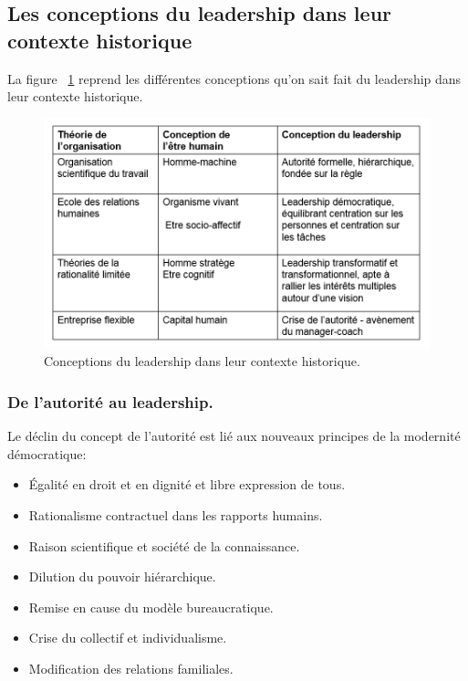 \documentclass[12pt]{article}
\begin{document}
	\subsection{Les conceptions du leadership dans leur contexte historique}
	
	La figure ~\ref{conceptions_leaderships} reprend les différentes conceptions qu'on sait fait du leadership dans leur contexte historique.

	\begin{figure}[h]
		\begin{center}
		\includegraphics[scale=0.6]{conceptions_leaderships.png}
		\caption{Conceptions du leadership dans leur contexte historique.}
		\label{conceptions_leaderships}
		\end{center}
	\end{figure}
	
	
	\subsubsection{De l'autorité au leadership.}
	
	Le déclin du concept de l'autorité est lié aux nouveaux principes de la modernité démocratique:
	\begin{itemize}
	\item Égalité en droit et en dignité et libre expression de tous.
	\item Rationalisme contractuel dans les rapports humains.
	\item Raison scientifique et société de la connaissance.
	\item Dilution du pouvoir hiérarchique.
	\item Remise en cause du modèle bureaucratique.
	\item Crise du collectif et individualisme.
	\item Modification des relations familiales. \newline
	\end{itemize}
	
\end{document}
